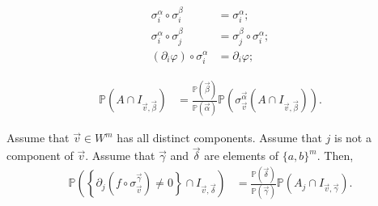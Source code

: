 \documentclass[10pt,a4paper]{amsart}
\begin{document}
\begin{align} 
\sigma_i^{\alpha}\circ \sigma_i^{\beta}&=\sigma_i^{\alpha};   \label{eqn|propertyA}\\
\sigma_i^{\alpha}\circ \sigma_j^{\beta}&=\sigma_j^{\beta}\circ\sigma_i^{\alpha};  \label{eqn|propertyB} \\
(\partial_i \varphi)\circ \sigma_i^{\alpha} &= \partial_i \varphi;  \label{eqn|propertyC}
\end{align} 

\begin{align}
\mathbb P\left(A\cap I_{\overrightarrow v,\overrightarrow\beta} \right)&= \frac{\mathbb P(\overrightarrow\beta)}{\mathbb P\left(\overrightarrow\alpha\right)} \mathbb P\left( 
\sigma_{\overrightarrow v}^{\overrightarrow \alpha}\left(
A\cap I_{\overrightarrow v,\overrightarrow \beta}
\right)\right).
 \label{eqn|TiltingFormulaMD} 
\end{align}

\begin{theorem}\label{thm|multipleFlips}
Assume that $\overrightarrow v\in W^m$ has all distinct components. Assume that $j$ is not a component of $\overrightarrow v$. Assume that $\overrightarrow \gamma$ and $\overrightarrow \delta$ are elements of $\{a,b\}^m$. Then, 
\begin{align}
\mathbb P\left(\left\{\partial_j \left(f\circ \sigma_{\overrightarrow v}^{\overrightarrow\gamma}\right)\neq0\right\} \cap I_{\overrightarrow v,\overrightarrow\delta}\right)
&= 
\frac{\mathbb P(\overrightarrow\delta)}{\mathbb P(\overrightarrow\gamma)} \mathbb P(A_j\cap I_{\overrightarrow v,\overrightarrow\gamma}).
\label{eqn|multipleFlips}
\end{align}
\end{theorem}
\end{document}
